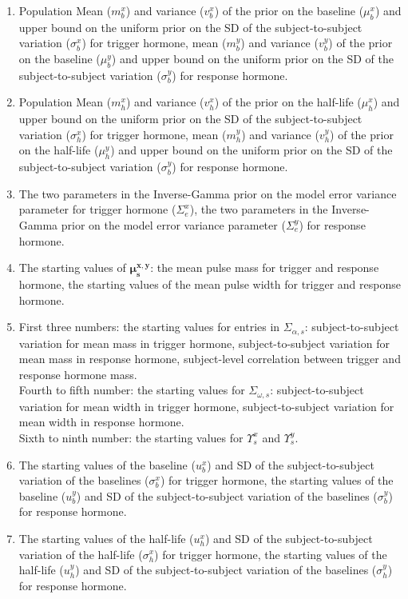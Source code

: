 \documentclass[12pt, oneside]{article}   	%
\begin{document}
\begin{enumerate}
\item Population Mean ($m^x_b$) and variance ($v^x_b$) of the prior on the baseline ($\mu^x_b$) and upper bound on the uniform prior on the SD of the subject-to-subject variation ($\sigma^x_b$) for trigger hormone, mean ($m^y_b$) and variance ($v^y_b$) of the prior on the baseline ($\mu^y_b$) and upper bound on the uniform prior on the SD of the subject-to-subject variation ($\sigma^y_b$) for response hormone.
\item Population Mean ($m^x_h$) and variance ($v^x_h$) of the prior on the half-life ($\mu^x_h$) and upper bound on the uniform prior on the SD of the subject-to-subject variation ($\sigma^x_h$) for trigger hormone, mean ($m^y_h$) and variance ($v^y_h$) of the prior on the half-life ($\mu^y_h$) and upper bound on the uniform prior on the SD of the subject-to-subject variation ($\sigma^y_b$) for response hormone.
\item The two parameters in the Inverse-Gamma prior on the model error variance parameter for trigger hormone ($\Sigma^x_e$), the two parameters in the Inverse-Gamma prior on the model error variance parameter ($\Sigma^y_e$) for response hormone.
\item The starting values of $\boldsymbol{\mu^{x,y}_{s}}$: the mean  pulse mass for trigger and response hormone, the starting values of the mean pulse width for trigger and response hormone.
\item First three numbers: the starting values for entries in $\Sigma_{\alpha,s}$: subject-to-subject variation for mean mass in trigger hormone,   subject-to-subject variation for mean mass in response hormone, subject-level correlation between trigger and response hormone mass.\\
Fourth to fifth number: the starting values for $\Sigma_{\omega,s}$: subject-to-subject variation for mean width in trigger hormone,  subject-to-subject variation for mean width in response hormone.\\
Sixth to ninth number: the starting values for $\Upsilon^x_s$ and $\Upsilon^y_s$.
\item The starting values of the baseline ($u^x_b$) and SD of the subject-to-subject variation of the baselines ($\sigma^x_b$) for trigger hormone, the starting values of the baseline ($u^y_b$) and SD of the subject-to-subject variation of the baselines ($\sigma^y_b$) for response hormone.
\item The starting values of the half-life ($u^x_h$) and SD of the subject-to-subject variation of the half-life ($\sigma^x_h$) for trigger hormone, the starting values of the half-life ($u^y_h$) and SD of the subject-to-subject variation of the baselines ($\sigma^y_h$) for response hormone.

\end{enumerate}
\end{document}
